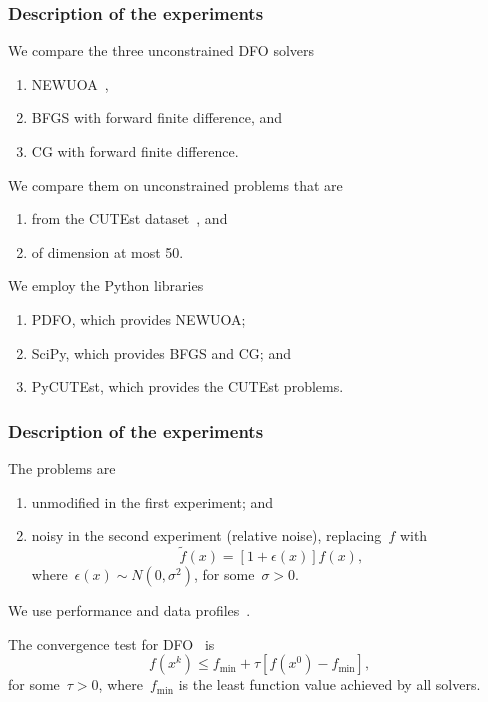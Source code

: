 \documentclass{polyu-presentation}
\newcommand{\obj}{f}
\begin{document}
\begin{frame}
    \frametitle{Description of the experiments}

    We compare the three unconstrained DFO solvers
    \begin{enumerate}
        \item \alert{NEWUOA}~\parencite{Powell_2006,Powell_2008},
        \item \alert{BFGS} with forward finite difference, and
        \item \alert{CG} with forward finite difference.
    \end{enumerate}

    \medskip

    We compare them on unconstrained problems that are
    \begin{enumerate}
        \item from the \alert{CUTEst} dataset~\parencite{Gould_Orban_Toint_2015}, and
        \item of dimension at most \num{50}.
    \end{enumerate}

    \medskip

    We employ the Python libraries
    \begin{enumerate}
        \item \alert{PDFO}, which provides NEWUOA;
        \item \alert{SciPy}, which provides BFGS and CG; and
        \item \alert{PyCUTEst}, which provides the CUTEst problems.
    \end{enumerate}
\end{frame}

\begin{frame}
    \frametitle{Description of the experiments}

    The problems are
    \begin{enumerate}
        \item \alert{unmodified} in the first experiment; and
        \item \alert{noisy} in the second experiment (relative noise), replacing~$f$ with
        \begin{equation*}
            \tilde{\obj}(x) = [1 + \epsilon(x)] \obj(x),
        \end{equation*}
        where~$\epsilon(x) \sim N(0, \sigma^2)$, for some~$\sigma > 0$.
    \end{enumerate}

    \bigskip

    We use \alert{performance and data profiles}~\parencite{Dolan_More_2002}.
    
    The \alert{convergence test} for DFO~\parencite{More_Wild_2009} is
    \begin{equation*}
        \obj(x^k) \le \obj_{\min} + \tau [\obj(x^0) - \obj_{\min}],
    \end{equation*}
    for some~$\tau > 0$, where~$\obj_{\min}$ is the least function value achieved by all solvers.
\end{frame}
\end{document}
